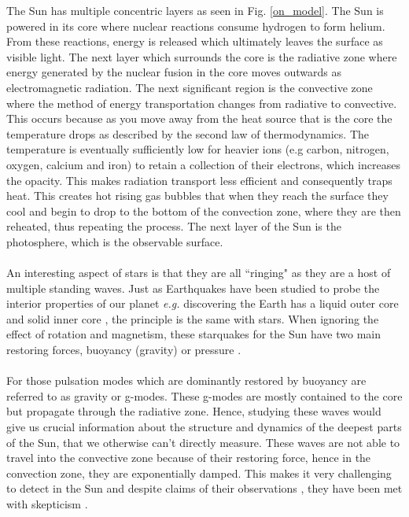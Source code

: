 \documentclass[12pt]{ociamthesis}
\newcommand{\np}{\\ \\}
\begin{document}
%
The Sun has multiple concentric layers as seen in Fig. \ref{on_model}. The Sun is powered in its core where nuclear reactions consume hydrogen to form helium. From these reactions, energy is released which ultimately leaves the surface as visible light. The next layer which surrounds the core is the radiative zone where energy generated by the nuclear fusion in the core moves outwards as electromagnetic radiation. The next significant region is the convective zone where the method of energy transportation changes from radiative to convective. This occurs because as you move away from the heat source that is the core the temperature drops as described by the second law of thermodynamics. The temperature is eventually sufficiently low for heavier ions (e.g carbon, nitrogen, oxygen, calcium and iron) to retain a collection of their electrons, which increases the opacity. This makes radiation transport less efficient and consequently traps heat. This creates hot rising gas bubbles that when they reach the surface they cool and begin to drop to the bottom of the convection zone, where they are then reheated, thus repeating the process. The next layer of the Sun is the photosphere, which is the observable surface. \np
%
An interesting aspect of stars is that they are all ``ringing" as they are a host of multiple standing waves. Just as Earthquakes have been studied to probe the interior properties of our planet \textit{e.g.} discovering the Earth has a liquid outer core and solid inner core \citep{Lehmann1936}, the principle is the same with stars. When ignoring the effect of rotation and magnetism, these starquakes for the Sun have two main restoring forces, buoyancy (gravity) or pressure \citep{Appourchaux2010AARv18197A}. \np
%
For those pulsation modes which are dominantly restored by buoyancy are referred to as gravity or g-modes. These g-modes are mostly contained to the core but propagate through the radiative zone. Hence, studying these waves would give us crucial information about the structure and dynamics of the deepest parts of the Sun, that we otherwise can't directly measure. These waves are not able to travel into the convective zone because of their restoring force, hence in the convection zone, they are exponentially damped. This makes it very challenging to detect in the Sun and despite claims of their observations \citep{ Garc2007Sci3161591G, Fossat2017AA604A40F, Fossat2018AA612L1F}, they have been met with skepticism \citep{Appourchaux2010AARv18197A, Schunker2018SoPh29395S,Appourchaux2019AA624A106A, Scherrer2019ApJ87742S}. \np
%
\end{document}
